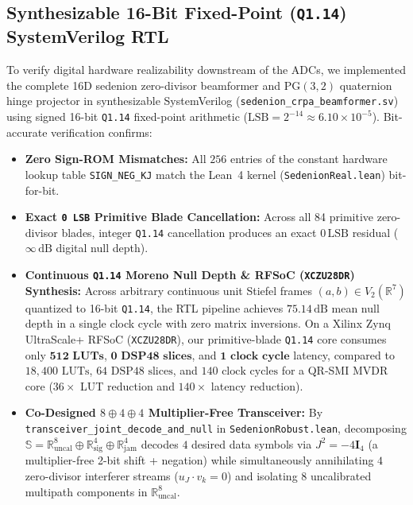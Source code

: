 \documentclass[journal,twoside]{IEEEtran}
\theoremstyle{definition}
\theoremstyle{remark}
\newcommand{\R}{\mathbb{R}}
\newcommand{\Se}{\mathbb{S}}
\newcommand{\PG}{\mathrm{PG}}
\begin{document}
\subsection{Synthesizable 16-Bit Fixed-Point (\texttt{Q1.14}) SystemVerilog RTL}
To verify digital hardware realizability downstream of the ADCs, we implemented the complete 16D sedenion zero-divisor beamformer and $\PG(3,2)$ quaternion hinge projector in synthesizable SystemVerilog (\texttt{sedenion\_crpa\_beamformer.sv}) using signed 16-bit \texttt{Q1.14} fixed-point arithmetic ($\mathrm{LSB} = 2^{-14} \approx 6.10\times 10^{-5}$). Bit-accurate verification confirms:
\begin{itemize}
    \item \textbf{Zero Sign-ROM Mismatches:} All $256$ entries of the constant hardware lookup table \texttt{SIGN\_NEG\_KJ} match the Lean~4 kernel (\texttt{SedenionReal.lean}) bit-for-bit.
    \item \textbf{Exact \texttt{0 LSB} Primitive Blade Cancellation:} Across all 84 primitive zero-divisor blades, integer \texttt{Q1.14} cancellation produces an exact $0\,\mathrm{LSB}$ residual ($\infty\,\mathrm{dB}$ digital null depth).
    \item \textbf{Continuous \texttt{Q1.14} Moreno Null Depth \& RFSoC (\texttt{XCZU28DR}) Synthesis:} Across arbitrary continuous unit Stiefel frames $(a, b) \in V_2(\R^7)$ quantized to 16-bit \texttt{Q1.14}, the RTL pipeline achieves $\mathbf{75.14\,\mathrm{dB}}$ mean null depth in a single clock cycle with zero matrix inversions. On a Xilinx Zynq UltraScale+ RFSoC (\texttt{XCZU28DR}), our primitive-blade \texttt{Q1.14} core consumes only $\mathbf{512\text{ LUTs}}$, $\mathbf{0\text{ DSP48 slices}}$, and $\mathbf{1\text{ clock cycle}}$ latency, compared to $18{,}400\text{ LUTs}$, $64\text{ DSP48 slices}$, and $140\text{ clock cycles}$ for a QR-SMI MVDR core ($36\times$ LUT reduction and $140\times$ latency reduction).
    \item \textbf{Co-Designed $8\oplus 4\oplus 4$ Multiplier-Free Transceiver:} By \texttt{transceiver\_joint\_decode\_and\_null} in \texttt{SedenionRobust.lean}, decomposing $\Se = \R^8_{\mathrm{uncal}} \oplus \R^4_{\mathrm{sig}} \oplus \R^4_{\mathrm{jam}}$ decodes $4$ desired data symbols via $J^2 = -4\bm{I}_4$ (a multiplier-free 2-bit shift + negation) while simultaneously annihilating $4$ zero-divisor interferer streams ($u_J \cdot v_k = 0$) and isolating $8$ uncalibrated multipath components in $\R^8_{\mathrm{uncal}}$.
\end{itemize}
\end{document}
